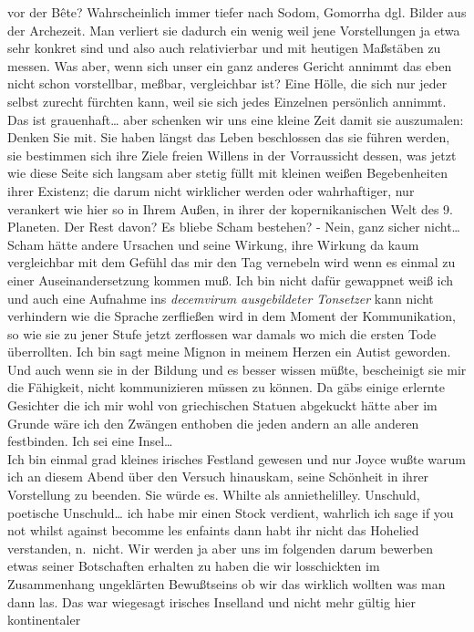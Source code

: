 \documentclass[
]{article}
\begin{document}
vor der Bête? Wahrscheinlich immer tiefer nach Sodom, Gomorrha dgl.
Bilder aus der Archezeit. Man verliert sie dadurch ein wenig weil jene
Vorstellungen ja etwa sehr konkret sind und also auch relativierbar und
mit heutigen Maßstäben zu messen. Was aber, wenn sich unser ein ganz
anderes Gericht annimmt das eben nicht schon vorstellbar, meßbar,
vergleichbar ist? Eine Hölle, die sich nur jeder selbst zurecht fürchten
kann, weil sie sich jedes Einzelnen persönlich annimmt. Das ist
grauenhaft\ldots{} aber schenken wir uns eine kleine Zeit damit sie
auszumalen: Denken Sie mit. Sie haben längst das Leben beschlossen das
sie führen werden, sie bestimmen sich ihre Ziele freien Willens in der
Vorraussicht dessen, was jetzt wie diese Seite sich langsam aber stetig
füllt mit kleinen weißen Begebenheiten ihrer Existenz; die darum nicht
wirklicher werden oder wahrhaftiger, nur verankert wie hier so in Ihrem
Außen, in ihrer der kopernikanischen Welt des 9. Planeten. Der Rest
davon? Es bliebe Scham bestehen? - Nein, ganz sicher nicht\ldots{} Scham
hätte andere Ursachen und seine Wirkung, ihre Wirkung da kaum
vergleichbar mit dem Gefühl das mir den Tag vernebeln wird wenn es
einmal zu einer Auseinandersetzung kommen muß. Ich bin nicht dafür
gewappnet weiß ich und auch eine Aufnahme ins \emph{decemvirum
ausgebildeter Tonsetzer} kann nicht verhindern wie die Sprache
zerfließen wird in dem Moment der Kommunikation, so wie sie zu jener
Stufe jetzt zerflossen war damals wo mich die ersten Tode überrollten.
Ich bin sagt meine Mignon in meinem Herzen ein Autist geworden. Und auch
wenn sie in der Bildung und es besser wissen müßte, bescheinigt sie mir
die Fähigkeit, nicht kommunizieren müssen zu können. Da gäbs einige
erlernte Gesichter die ich mir wohl von griechischen Statuen abgekuckt
hätte aber im Grunde wäre ich den Zwängen enthoben die jeden andern an
alle anderen festbinden. Ich sei eine Insel\ldots{}\\
Ich bin einmal grad kleines irisches Festland gewesen und nur Joyce
wußte warum ich an diesem Abend über den Versuch hinauskam, seine
Schönheit in ihrer Vorstellung zu beenden. Sie würde es. Whilte als
anniethelilley. Unschuld, poetische Unschuld\ldots{} ich habe mir einen
Stock verdient, wahrlich ich sage if you not whilst against becomme les
enfaints dann habt ihr nicht das Hohelied verstanden, n.~nicht. Wir
werden ja aber uns im folgenden darum bewerben etwas seiner Botschaften
erhalten zu haben die wir losschickten im Zusammenhang ungeklärten
Bewußtseins ob wir das wirklich wollten was man dann las. Das war
wiegesagt irisches Inselland und nicht mehr gültig hier kontinentaler
\end{document}
